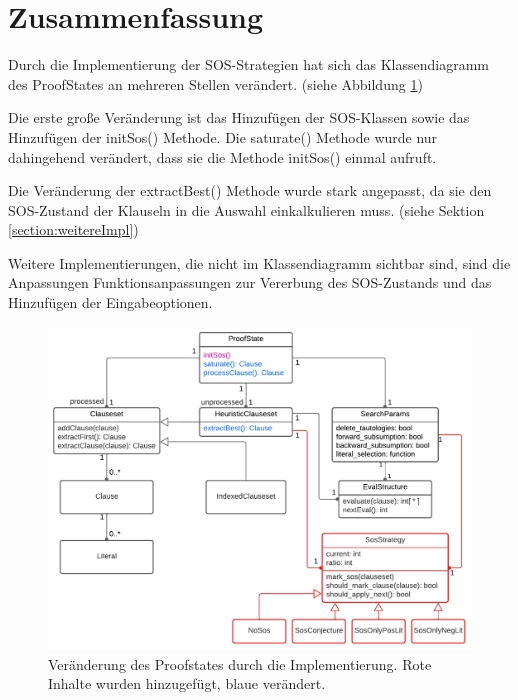 \section{Zusammenfassung}
Durch die Implementierung der SOS-Strategien hat sich das Klassendiagramm des ProofStates an mehreren Stellen verändert. (siehe Abbildung \ref{fig:pyresproofstatenew})

Die erste große Veränderung ist das Hinzufügen der SOS-Klassen sowie das Hinzufügen der initSos() Methode. Die saturate() Methode wurde nur dahingehend verändert, dass sie die Methode initSos() einmal aufruft. 

Die Veränderung der extractBest() Methode wurde stark angepasst, da sie den SOS-Zustand der Klauseln in die Auswahl einkalkulieren muss. (siehe Sektion \ref{section:weitereImpl})

Weitere Implementierungen, die nicht im Klassendiagramm sichtbar sind, sind die Anpassungen Funktionsanpassungen zur Vererbung des SOS-Zustands und das Hinzufügen der Eingabeoptionen.

\begin{figure}
	\centering
	\includegraphics[width=1\linewidth]{images/Lucid/PyResProofStateNew}
	\caption[Veränderung des Proofstates durch die Implementierung]{Veränderung des Proofstates durch die Implementierung. Rote Inhalte wurden hinzugefügt, blaue verändert.}
	\label{fig:pyresproofstatenew}
\end{figure}
